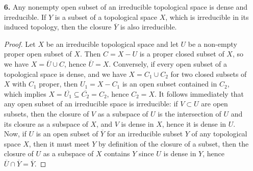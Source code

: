 \documentclass{article}
\begin{document}
\begin{enumerate} [label=\textbf{\arabic*.}, leftmargin=0em]
\begin{proof}
    We claim that
    \begin{equation*}
        Y = Z((x, y)) \cup Z((x, z)) \cup Z((x^2 - y, z - 1)).
    \end{equation*}
    It is clear the subsets $Z((x, y))$ and $Z((x, z))$ are irreducible. What is less obvious is the irreducibility of $Z((x^2 - y, z - 1))$. Observe that
    \begin{equation*}
        \frac{k[x, y, z]}{(x^2 - y, z - 1)} \simeq \frac{k[x, y]}{(x^2 - y)} \simeq k[x, x^2] \simeq k[x],
    \end{equation*} 
    hence $(x^2 - y, z - 1)$ is a prime ideal, hence $Z((x^2 - y, z - 1))$ is irreducible.
    If $P = (u, v, w) \in Y$, then $u^2 - vw = 0$ and $uw - u = 0$, so by the second equation either $u = 0$ or $u = 1$. If $u = 0$, either $v = 0$ or $w = 0$, which implies $P \in Z((x, y))$ or $P \in Z((x, z))$. If $u = 1$, then we have $P \in Z((x^2 - y, z - 1))$. The converse direction follows in similar fashion.
\end{proof}

\item[\textbf{6.}] Any nonempty open subset of an irreducible topological space is dense and irreducible. If $Y$ is a subset of a topological space $X$, which is irreducible in its induced topology, then the closure $\overline{Y}$ is also irreducible.

\begin{proof}
    Let $X$ be an irreducible topological space and let $U$ be a non-empty proper open subset of $X$. Then $C = X - U$ is a proper closed subset of $X$, so we have $X = \overline{U} \cup C$, hence $\overline{U} = X$. Conversely, if every open subset of a topological space is dense, and we have $X = C_1 \cup C_2$ for two closed subsets of $X$ with $C_1$ proper, then $U_1 = X - C_1$ is an open subset contained in $C_2$, which implies $X = \overline{U_1} \subseteq \overline{C_2} = C_2$, hence $C_2 = X$. It follows immediately that any open subset of an irreducible space is irreducible: if $V \subset U$ are open subsets, then the closure of $V$ as a subspace of $U$ is the intersection of $U$ and its closure as a subspace of $X$, and $V$ is dense in $X$, hence it is dense in $U$. Now, if $U$ is an open subset of $\overline{Y}$ for an irreducible subset $Y$ of any topological space $X$, then it must meet $Y$ by definition of the closure of a subset, then the closure of $U$ as a subspace of $X$ contains $Y$ since $U$ is dense in $Y$, hence $\overline{U} \cap \overline{Y} = \overline{Y}$.
\end{proof}


\end{enumerate}
\end{document}
